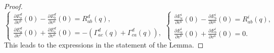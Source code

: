 \documentclass[10pt,a4paper]{amsart}
\begin{document}
\begin{proof}
\begin{equation}
\begin{cases}
\displaystyle      \frac{\partial E_a^d}{\partial v^b}(0)-\frac{\partial E_b^d}{\partial v^a}(0)=R_{ab}^d(q),\\[2mm]
   \displaystyle   \frac{\partial E_a^d}{\partial v^c}(0)+\frac{\partial E_c^d}{\partial v^a}(0) =-(\Gamma_{ac}^d(q)+\Gamma_{ca}^d(q)),
    \end{cases}\nonumber  \begin{cases}
\displaystyle        \frac{\partial E_a^i}{\partial v^b}(0)-\frac{\partial E_b^i}{\partial v^a}(0) =R_{ab}^i(q), \\[2mm]
\displaystyle        \frac{\partial E_a^i}{\partial v^b}(0)+\frac{\partial E_b^i}{\partial v^a}(0)=0 .
    \end{cases}
\end{equation}
This leads to the expressions in the statement of the Lemma.
\end{proof}
\end{document}
